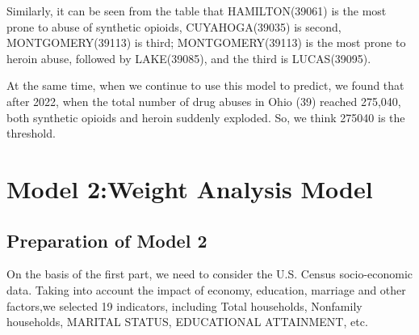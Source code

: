 \documentclass[12pt]{mcmthesis}
\begin{document}
\par Similarly, it can be seen from the table that HAMILTON(39061) is the most prone to abuse of synthetic opioids, CUYAHOGA(39035) is second, MONTGOMERY(39113) is third; MONTGOMERY(39113) is the most prone to heroin abuse, followed by LAKE(39085), and the third is LUCAS(39095).\par
At the same time, when we continue to use this model to predict, we found that after 2022, when the total number of drug abuses in Ohio (39) reached 275,040, both synthetic opioids and heroin suddenly exploded. So, we think 275040 is the threshold.
\section{Model 2:Weight Analysis Model}
\subsection{Preparation of Model 2}
On the basis of the first part, we need to consider the U.S. Census socio-economic data. Taking into account the impact of economy, education, marriage and other factors,we selected 19 indicators, including Total households, Nonfamily households, MARITAL STATUS, EDUCATIONAL ATTAINMENT, etc.
\end{document}
